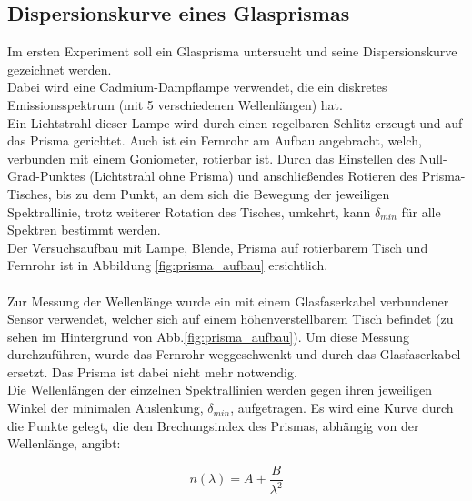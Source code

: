 \documentclass[12pt,a4paper]{article}
\begin{document}
\pagebreak
\setlength{\columnsep}{20pt}
\begin{multicols}{2}


%

\section{Dispersionskurve eines Glasprismas}
Im ersten Experiment soll ein Glasprisma untersucht und seine Dispersionskurve gezeichnet werden.\\
Dabei wird eine Cadmium-Dampflampe verwendet, die ein diskretes Emissionsspektrum (mit 5 verschiedenen Wellenlängen) hat.\\
Ein Lichtstrahl dieser Lampe wird durch einen regelbaren Schlitz erzeugt und auf das Prisma gerichtet. Auch ist ein Fernrohr am Aufbau angebracht, welch, verbunden mit einem Goniometer, rotierbar ist. 
Durch das Einstellen des Null-Grad-Punktes (Lichtstrahl ohne Prisma) und anschließendes Rotieren des Prisma-Tisches, bis zu dem Punkt, an dem sich die Bewegung der jeweiligen Spektrallinie, trotz weiterer Rotation des Tisches, umkehrt, kann $\delta_{min}$ für alle Spektren bestimmt werden. \\
Der Versuchsaufbau mit Lampe, Blende, Prisma auf rotierbarem Tisch und Fernrohr ist in Abbildung \ref{fig:prisma_aufbau} ersichtlich.\\
\\
Zur Messung der Wellenlänge wurde ein mit einem Glasfaserkabel verbundener Sensor verwendet, welcher sich auf einem höhenverstellbarem Tisch befindet (zu sehen im Hintergrund von Abb.\ref{fig:prisma_aufbau}). Um diese Messung durchzuführen, wurde das Fernrohr weggeschwenkt und durch das Glasfaserkabel ersetzt. Das Prisma ist dabei nicht mehr notwendig.
\\ 
Die Wellenlängen der einzelnen Spektrallinien werden gegen ihren jeweiligen Winkel der minimalen Auslenkung, $\delta_{min}$, aufgetragen. Es wird eine Kurve durch die Punkte gelegt, die den Brechungsindex des Prismas, abhängig von der Wellenlänge, angibt:

$$n(\lambda) = A + \frac{B}{\lambda^2}$$
\\



\end{multicols}
\end{document}
